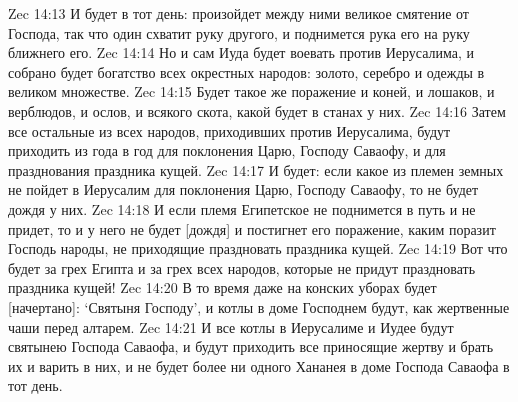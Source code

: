 Zec 14:13  И будет в тот день: произойдет между ними великое смятение от Господа, так что один схватит руку другого, и поднимется рука его на руку ближнего его.
Zec 14:14  Но и сам Иуда будет воевать против Иерусалима, и собрано будет богатство всех окрестных народов: золото, серебро и одежды в великом множестве.
Zec 14:15  Будет такое же поражение и коней, и лошаков, и верблюдов, и ослов, и всякого скота, какой будет в станах у них.
Zec 14:16  Затем все остальные из всех народов, приходивших против Иерусалима, будут приходить из года в год для поклонения Царю, Господу Саваофу, и для празднования праздника кущей.
Zec 14:17  И будет: если какое из племен земных не пойдет в Иерусалим для поклонения Царю, Господу Саваофу, то не будет дождя у них.
Zec 14:18  И если племя Египетское не поднимется в путь и не придет, то и у него не будет [дождя] и постигнет его поражение, каким поразит Господь народы, не приходящие праздновать праздника кущей.
Zec 14:19  Вот что будет за грех Египта и за грех всех народов, которые не придут праздновать праздника кущей!
Zec 14:20  В то время даже на конских уборах будет [начертано]: `Святыня Господу', и котлы в доме Господнем будут, как жертвенные чаши перед алтарем.
Zec 14:21  И все котлы в Иерусалиме и Иудее будут святынею Господа Саваофа, и будут приходить все приносящие жертву и брать их и варить в них, и не будет более ни одного Хананея в доме Господа Саваофа в тот день.


